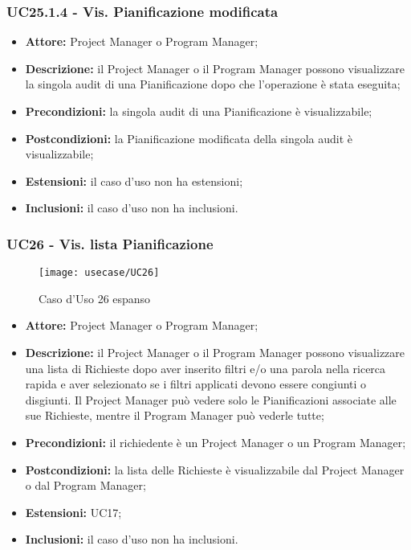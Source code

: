 \subsubsection*{UC25.1.4 - Vis. Pianificazione modificata}

\begin{itemize}[label=$\circ$]
\item \textbf{Attore:} Project Manager o Program Manager;
\item \textbf{Descrizione:} il Project Manager o il Program Manager possono visualizzare la
singola audit di una Pianificazione dopo che l’operazione è stata eseguita;
\item \textbf{Precondizioni:} la singola audit di una Pianificazione è visualizzabile;
\item \textbf{Postcondizioni:} la Pianificazione modificata della singola audit è visualizzabile;
\item \textbf{Estensioni:} il caso d'uso non ha estensioni;
\item \textbf{Inclusioni:} il caso d'uso non ha inclusioni.
\end{itemize}

\subsubsection*{UC26 - Vis. lista Pianificazione}
\begin{figure}[H] 
    \texttt{[image: usecase/UC26]} 
    \caption{Caso d'Uso 26 espanso}
\end{figure}

\begin{itemize}[label=$\circ$]
\item \textbf{Attore:}  Project Manager o Program Manager;
\item \textbf{Descrizione:} il Project Manager o il Program Manager possono visualizzare
una lista di Richieste dopo aver inserito filtri e/o una parola nella ricerca rapida
e aver selezionato se i filtri applicati devono essere congiunti o disgiunti. Il Project Manager può vedere solo le Pianificazioni associate alle sue Richieste, mentre il Program Manager può vederle tutte;
\item \textbf{Precondizioni:} il richiedente è un Project Manager o un Program Manager;
\item \textbf{Postcondizioni:} la lista delle Richieste è visualizzabile dal Project Manager o dal Program Manager;
\item \textbf{Estensioni:} UC17;
\item \textbf{Inclusioni:} il caso d'uso non ha inclusioni.
\end{itemize}


